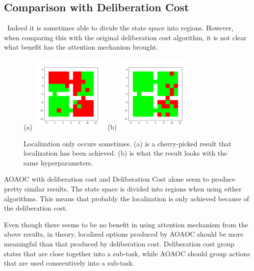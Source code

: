 \documentclass{article}
\begin{document}
	\subsection*{Comparison with Deliberation Cost}
	\qquad \ Indeed it is sometimes able to divide the state space into regions. However, when comparing this with the original deliberation cost algorithm, it is not clear what benefit has the attention mechanism brought. 
	\begin{figure}[h]
		\centering
		\large{(a)}
		\includegraphics[width=1.5in]{goodPicked.png}
		\hspace{0.2in}
		\large{(b)}
		\includegraphics[width=1.5in]{badPicked.png}
		\caption{Localization only occurs sometimes. (a) is a cherry-picked result that localization has been achieved. (b) is what the result looks with the same hyperparameters.}
	\end{figure}

	\quad AOAOC with deliberation cost and Deliberation Cost alone seem to produce pretty similar results. The state space is divided into regions when using either algorithms. This means that probably the localization is only achieved because of the deliberation cost.
	
	\quad Even though there seems to be no benefit in using attention mechanism from the above results, in theory, localized options produced by AOAOC should be more meaningful than that produced by deliberation cost. Deliberation cost group states that are close together into a sub-task, while AOAOC should group actions that are used consecutively into a sub-task.
	
\end{document}
